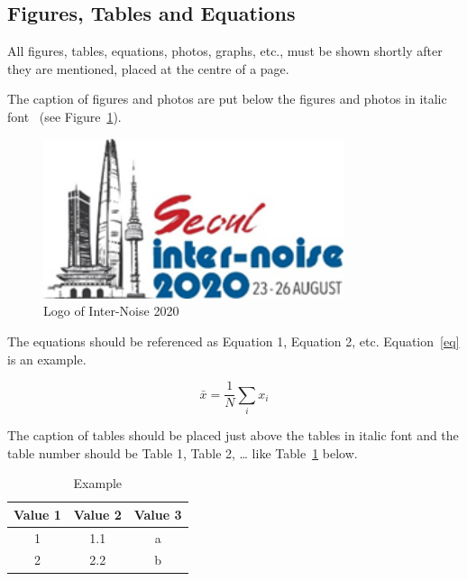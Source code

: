 \documentclass[a4paper,12pt]{article}
\renewcommand\eqref[1]{Equation~\ref{#1}}
\begin{document}
\subsection{Figures, Tables and Equations}
All figures, tables, equations, photos, graphs, etc., must be shown shortly after they are mentioned, placed at the centre of a page. \par 
The caption of figures and photos are put below the figures and photos in italic font ~\cite{andre18}(see Figure~\ref{fig:logo}).

\begin{figure}[!h]
	\centering
	\includegraphics[width=88mm]{logo2020.png}
	\caption{Logo of Inter-Noise 2020}
	\label{fig:logo}
\end{figure}

The equations should be referenced as Equation 1, Equation 2, etc.
\eqref{eq} is an example.  

\begin{equation}
	\bar x= \frac{1}{N}\sum_ix_i
	\label{eq}
\end{equation}

The caption of tables should be placed just above the tables in italic font and the table number should be Table 1, Table 2, … like Table~\ref{tab:table1} below.

\begin{table}[h!]
  \begin{center}
    \caption{Example}  
    \label{tab:table1}
    \begin{tabular}{c c c} 
     \hline	
      \textbf{Value 1} & \textbf{Value 2} & \textbf{Value 3}\\
      \hline
      1 & 1.1 & a\\
      \hline	
      2 & 2.2 & b\\
      \hline	
    \end{tabular}
  \end{center}

\end{table}
\end{document}
